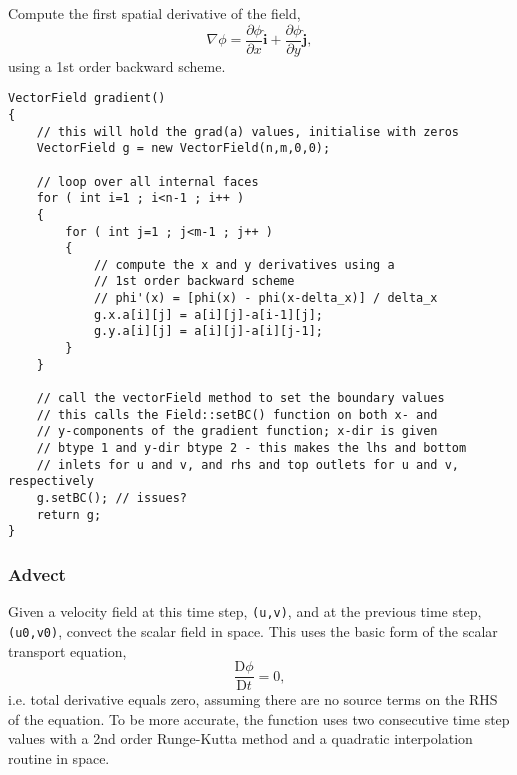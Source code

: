 \documentclass[notitlepage]{article}
\begin{document}
Compute the first spatial derivative of the field,
%
\begin{equation}
\nabla \phi = \frac{\partial\phi}{\partial x} \hat{\mathbf{i}}
	+ \frac{\partial\phi}{\partial y} \hat{\mathbf{j}},
\end{equation}
%
using a 1st order backward scheme.

\begin{lstlisting}[style=myCpp]
VectorField gradient()
{
	// this will hold the grad(a) values, initialise with zeros
	VectorField g = new VectorField(n,m,0,0);
	
	// loop over all internal faces
	for ( int i=1 ; i<n-1 ; i++ )
	{
		for ( int j=1 ; j<m-1 ; j++ )
		{
			// compute the x and y derivatives using a
			// 1st order backward scheme
			// phi'(x) = [phi(x) - phi(x-delta_x)] / delta_x
			g.x.a[i][j] = a[i][j]-a[i-1][j];
			g.y.a[i][j] = a[i][j]-a[i][j-1];
		}
	}
	
	// call the vectorField method to set the boundary values
	// this calls the Field::setBC() function on both x- and
	// y-components of the gradient function; x-dir is given
	// btype 1 and y-dir btype 2 - this makes the lhs and bottom
	// inlets for u and v, and rhs and top outlets for u and v, respectively
	g.setBC(); // issues?
	return g;
}
\end{lstlisting}

\subsubsection{Advect}

Given a velocity field at this time step, \texttt{(u,v)}, and at the previous time step,
\texttt{(u0,v0)}, convect the scalar field in space. This uses the basic form of the scalar
transport equation,
%
\begin{equation}
\frac{\mathrm{D} \phi}{\mathrm{D}t} = 0,
\end{equation}
%
i.e. total derivative equals zero, assuming there are no
source terms on the RHS of the equation. To be more accurate, the function uses
two consecutive time step values with a 2nd order Runge-Kutta method and a
quadratic interpolation routine in space.
\end{document}
